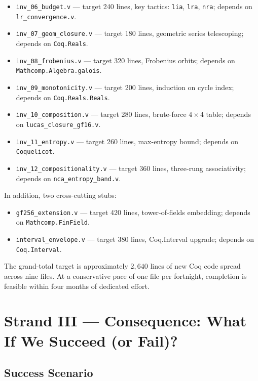 \begin{itemize}
    \item \texttt{inv\_06\_budget.v} — target 240 lines, key tactics: \texttt{lia}, \texttt{lra}, \texttt{nra}; depends on \texttt{lr\_convergence.v}.
    \item \texttt{inv\_07\_geom\_closure.v} — target 180 lines, geometric series telescoping; depends on \texttt{Coq.Reals}.
    \item \texttt{inv\_08\_frobenius.v} — target 320 lines, Frobenius orbits; depends on \texttt{Mathcomp.Algebra.galois}.
    \item \texttt{inv\_09\_monotonicity.v} — target 200 lines, induction on cycle index; depends on \texttt{Coq.Reals.Reals}.
    \item \texttt{inv\_10\_composition.v} — target 280 lines, brute-force $4 \times 4$ table; depends on \texttt{lucas\_closure\_gf16.v}.
    \item \texttt{inv\_11\_entropy.v} — target 260 lines, max-entropy bound; depends on \texttt{Coquelicot}.
    \item \texttt{inv\_12\_compositionality.v} — target 360 lines, three-rung associativity; depends on \texttt{nca\_entropy\_band.v}.
\end{itemize}

In addition, two cross-cutting stubs:
\begin{itemize}
    \item \texttt{gf256\_extension.v} — target 420 lines, tower-of-fields embedding; depends on \texttt{Mathcomp.FinField}.
    \item \texttt{interval\_envelope.v} — target 380 lines, Coq.Interval upgrade; depends on \texttt{Coq.Interval}.
\end{itemize}

The grand-total target is approximately $2{,}640$ lines of new Coq code spread across nine files. At a conservative pace of one file per fortnight, completion is feasible within four months of dedicated effort.

\section{Strand III — Consequence: What If We Succeed (or Fail)?}
\label{sec:31-strand-3}

\subsection{Success Scenario}
\label{sec:31-success}


